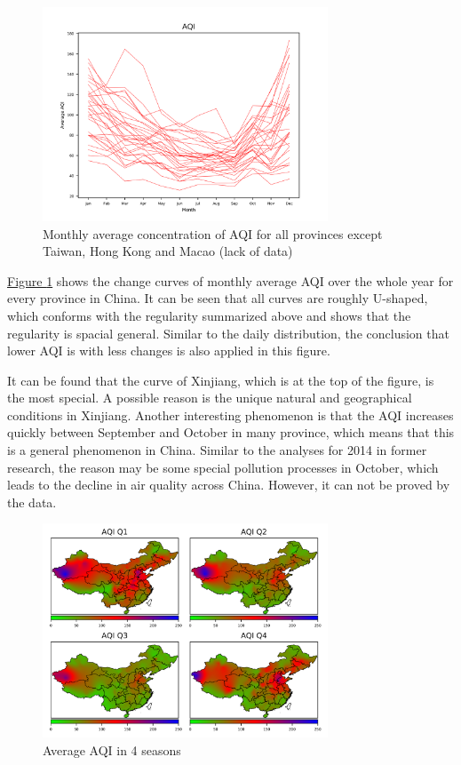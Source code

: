 \documentclass[letterpaper]{article}
\begin{document}
\begin{CJK*}{UTF8}{gkai}
\begin{figure}[h]
  \includegraphics[width = 8.5cm]{monavg_pro_pltn.png}
  \caption{Monthly average concentration of AQI for all provinces except Taiwan, Hong Kong and Macao (lack of data)}
  \label{figure:6}
\end{figure}

\hyperref[figure:6]{Figure \ref*{figure:6}} shows the change curves of monthly average AQI over the whole year for every province in China. It can be seen that all curves are roughly U-shaped, which conforms with the regularity summarized above and shows that the regularity is spacial general. Similar to the daily distribution, the conclusion that lower AQI is with less changes is also applied in this figure.

It can be found that the curve of Xinjiang, which is at the top of the figure, is the most special. A possible reason is the unique natural and geographical conditions in Xinjiang. Another interesting phenomenon is that the AQI increases quickly between September and October in many province, which means that this is a general phenomenon in China. Similar to the analyses for 2014 in former research, the reason may be some special pollution processes in October, which leads to the decline in air quality across China. However, it can not be proved by the data.

\begin{figure}[h]
  \includegraphics[width = 8.5cm]{AQI_season.png}
  \caption{Average AQI in 4 seasons}
  \label{figure:7}
\end{figure}


\end{CJK*}
\end{document}
